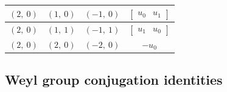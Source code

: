 \documentclass[11pt]{article}
\theoremstyle{definition}
\begin{document}
\begin{longtable}{|l|l|l|c|}
    \hline
    $\left( 2, \  0\right)$ & $\left( 1, \  0\right)$ & $\left( -1, \  0\right)$ & $\left[\begin{matrix}u_{0} & u_{1}\end{matrix}\right]$ \\
    \hline
    $\left( 2, \  0\right)$ & $\left( 1, \  1\right)$ & $\left( -1, \  1\right)$ & $\left[\begin{matrix}u_{1} & u_{0}\end{matrix}\right]$ \\
    \hline
    $\left( 2, \  0\right)$ & $\left( 2, \  0\right)$ & $\left( -2, \  0\right)$ & $- u_{0}$ \\
    \hline
\end{longtable}


\subsection{Weyl group conjugation identities}
\end{document}
